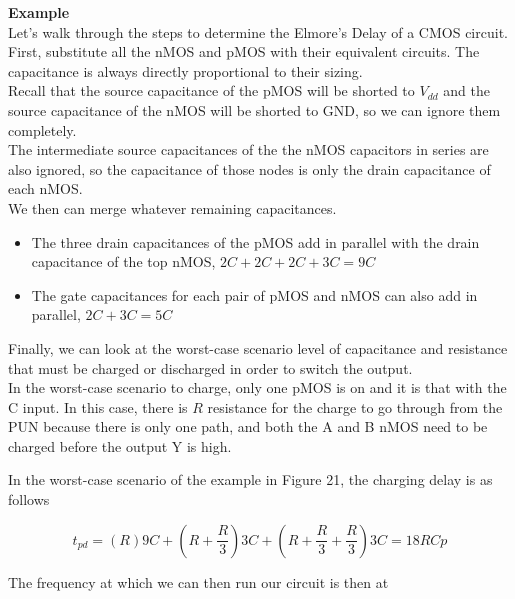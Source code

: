 \documentclass{article}
\begin{document}
\begin{minipage}{0.5\textwidth}
\textbf{Example} \\


Let's walk through the steps to determine the Elmore's Delay of a CMOS circuit. 
\\

First, substitute  all the nMOS and pMOS with their equivalent circuits. The capacitance is always directly proportional to their sizing. 
\\

Recall that the source capacitance of the pMOS will be shorted to $V_{dd}$ and the source capacitance of the nMOS will be shorted to GND, so we can ignore them completely.
\\

The intermediate source capacitances of the the nMOS capacitors in series are also ignored, so the capacitance of those nodes is only the drain capacitance of each nMOS.
\\ 

We then can merge whatever remaining capacitances.

\begin{itemize}
\item The three drain capacitances of the pMOS add in parallel with the drain capacitance of the top nMOS, $2C+2C+2C+3C=9C$
\item The gate capacitances for each pair of pMOS and nMOS can also add in parallel, $2C+3C=5C$ 
\end{itemize}

Finally, we can look at the worst-case scenario level of capacitance and resistance that must be charged or discharged in order to switch the output. 
\\ 

In the worst-case scenario to charge, only one pMOS is on and it is that with the C input. In this case, there is $R$ resistance for the charge to go through from the PUN because there is only one path, and both the A and B nMOS need to be charged before the output Y is high. 

\end{minipage}

In the worst-case scenario of the example in Figure 21, the charging delay is as follows

$$t_{pd} = (R)9C+(R+\dfrac{R}{3})3C + (R+\dfrac{R}{3}+\dfrac{R}{3})3C = 18 R Cp$$

The frequency at which we can then run our circuit is then at 
\end{document}
